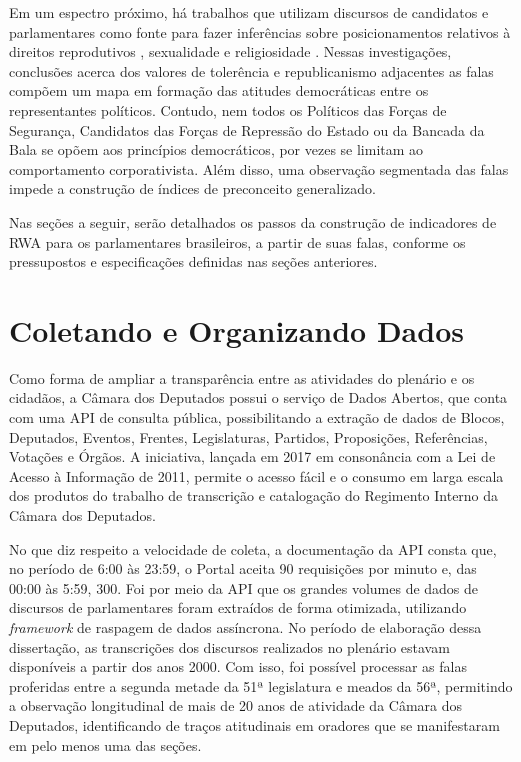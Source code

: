\documentclass[
12pt,				%
openright,			%
twoside,			%
a4paper,			%
english,			%
french,				%
spanish,			%
brazil				%
]{abntex2}
\begin{document}
Em um espectro próximo, há trabalhos que utilizam discursos de candidatos e parlamentares como fonte para fazer inferências sobre posicionamentos relativos à direitos reprodutivos \cite{miguel2017direito, santos2017debate}, sexualidade \cite{machado2013discursos, lacerda2016ideologia} e religiosidade \cite{gonccalves2016discurso}. Nessas investigações, conclusões acerca dos valores de tolerência e republicanismo adjacentes as falas compõem um mapa em formação das atitudes democráticas entre os representantes políticos. Contudo, nem todos os Políticos das Forças de Segurança, Candidatos das Forças de Repressão do Estado ou da Bancada da Bala se opõem aos princípios democráticos, por vezes se limitam ao comportamento corporativista. Além disso, uma observação segmentada das falas impede a construção de índices de preconceito generalizado. 

Nas seções a seguir, serão detalhados os passos da construção de indicadores de RWA para os parlamentares brasileiros, a partir de suas falas, conforme os pressupostos e especificações definidas nas seções anteriores.

\section{Coletando e Organizando Dados}

Como forma de ampliar a transparência entre as atividades do plenário e os cidadãos, a Câmara dos Deputados possui o serviço de Dados Abertos, que conta com uma API de consulta pública, possibilitando a extração de dados de Blocos, Deputados, Eventos, Frentes, Legislaturas, Partidos, Proposições, Referências, Votações e Órgãos. A iniciativa, lançada em 2017 em consonância com a Lei de Acesso à Informação de 2011, permite o acesso fácil e o consumo em larga escala dos produtos do trabalho de transcrição e catalogação do Regimento Interno da Câmara dos Deputados.

No que diz respeito a velocidade de coleta, a documentação da API consta que, no período de 6:00 às 23:59, o Portal aceita 90 requisições por minuto e, das 00:00 às 5:59, 300. Foi por meio da API que os grandes volumes de dados de discursos de parlamentares foram extraídos de forma otimizada, utilizando \emph{framework} de raspagem de dados assíncrona. No período de elaboração dessa dissertação, as transcrições dos discursos realizados no plenário estavam disponíveis a partir dos anos 2000. Com isso, foi possível processar as falas proferidas entre a segunda metade da 51ª legislatura e meados da 56ª, permitindo a observação longitudinal de mais de 20 anos de atividade da Câmara dos Deputados, identificando de traços atitudinais em oradores que se manifestaram em pelo menos uma das seções.
\end{document}
